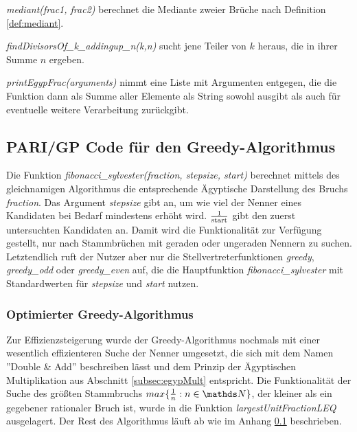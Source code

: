 \emph{mediant(frac1, frac2)} berechnet die Mediante zweier Brüche nach Definition \ref{def:mediant}.


\emph{findDivisorsOf\_k\_addingup\_n(k,n)} sucht jene Teiler von $k$ heraus, die in ihrer Summe $n$ ergeben.


\emph{printEgypFrac(arguments)} nimmt eine Liste mit Argumenten entgegen, die die Funktion dann als Summe aller Elemente als String sowohl ausgibt als auch für eventuelle weitere Verarbeitung zurückgibt.



\subsection{PARI/GP Code für den Greedy-Algorithmus}\label{code:greedy}
Die Funktion \emph{fibonacci\_sylvester(fraction, stepsize, start)} berechnet mittels des gleichnamigen Algorithmus die entsprechende Ägyptische Darstellung des Bruchs \emph{fraction}. Das Argument \emph{stepsize} gibt an, um wie viel der Nenner eines Kandidaten bei Bedarf mindestens erhöht wird. $\frac{1}{\text{start}}$ gibt den zuerst untersuchten Kandidaten an. Damit wird die Funktionalität zur Verfügung gestellt, \bspw nur nach Stammbrüchen mit geraden oder ungeraden Nennern zu suchen.\\
Letztendlich ruft der Nutzer aber nur die Stellvertreterfunktionen \emph{greedy}, \emph{greedy\_odd} oder \emph{greedy\_even} auf, die die Hauptfunktion \emph{fibonacci\_sylvester} mit Standardwerten für \emph{stepsize} und \emph{start} nutzen.



\subsubsection{Optimierter Greedy-Algorithmus}\label{code:greedy_fast}
Zur Effizienzsteigerung wurde der Greedy-Algorithmus nochmals mit einer wesentlich effizienteren Suche der Nenner umgesetzt, die sich mit dem Namen ''Double \& Add'' beschreiben lässt und dem Prinzip der Ägyptischen Multiplikation aus Abschnitt \ref{subsec:egypMult} entspricht. Die Funktionalität der Suche des größten Stammbruchs $max\{\uf{n}: n \in \N\}$, der kleiner als ein gegebener rationaler Bruch ist, wurde in die Funktion \emph{largestUnitFractionLEQ} ausgelagert. Der Rest des Algorithmus läuft ab wie im Anhang \ref{code:greedy} beschrieben.



